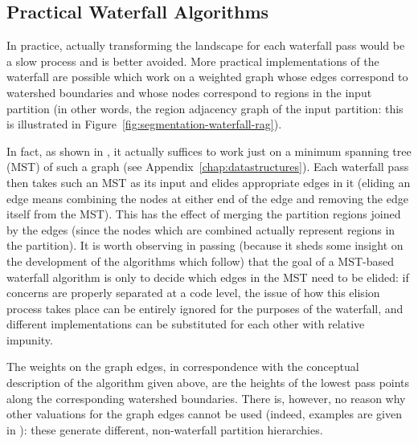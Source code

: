 \subsection{Practical Waterfall Algorithms}

In practice, actually transforming the landscape for each waterfall pass would be a slow process and is better avoided. More practical implementations of the waterfall are possible which work on a weighted graph whose edges correspond to watershed boundaries and whose nodes correspond to regions in the input partition (in other words, the region adjacency graph of the input partition: this is illustrated in Figure~\ref{fig:segmentation-waterfall-rag}).


In fact, as shown in \cite{marcotegui05}, it actually suffices to work just on a minimum spanning tree (MST) of such a graph (see Appendix~\ref{chap:datastructures}). Each waterfall pass then takes such an MST as its input and elides appropriate edges in it (eliding an edge means combining the nodes at either end of the edge and removing the edge itself from the MST). This has the effect of merging the partition regions joined by the edges (since the nodes which are combined actually represent regions in the partition). It is worth observing in passing (because it sheds some insight on the development of the algorithms which follow) that the goal of a MST-based waterfall algorithm is only to decide which edges in the MST need to be elided: if concerns are properly separated at a code level, the issue of how this elision process takes place can be entirely ignored for the purposes of the waterfall, and different implementations can be substituted for each other with relative impunity.

The weights on the graph edges, in correspondence with the conceptual description of the algorithm given above, are the heights of the lowest pass points along the corresponding watershed boundaries. There is, however, no reason why other valuations for the graph edges cannot be used (indeed, examples are given in \cite{marcotegui05}): these generate different, non-waterfall partition hierarchies.

